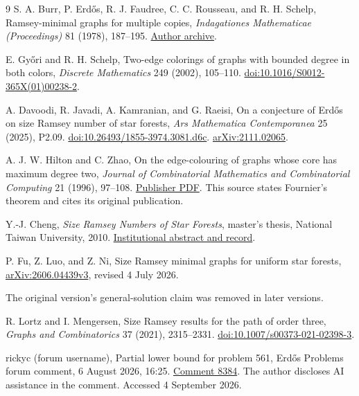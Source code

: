 \documentclass[11pt]{article}
\theoremstyle{remark}\newtheorem{remark}[theorem]{Remark}
\begin{document}
\begin{thebibliography}{9}
S. A. Burr, P. Erd\H{o}s, R. J. Faudree, C. C. Rousseau, and R. H. Schelp,
Ramsey-minimal graphs for multiple copies,
\emph{Indagationes Mathematicae (Proceedings)} 81 (1978), 187--195.
\href{https://users.renyi.hu/~p_erdos/1978-38.pdf}{Author archive}.

E. Gy\H{o}ri and R. H. Schelp,
Two-edge colorings of graphs with bounded degree in both colors,
\emph{Discrete Mathematics} 249 (2002), 105--110.
\href{https://doi.org/10.1016/S0012-365X(01)00238-2}{doi:10.1016/S0012-365X(01)00238-2}.

A. Davoodi, R. Javadi, A. Kamranian, and G. Raeisi,
On a conjecture of Erd\H{o}s on size Ramsey number of star forests,
\emph{Ars Mathematica Contemporanea} 25 (2025), P2.09.
\href{https://doi.org/10.26493/1855-3974.3081.d6c}{doi:10.26493/1855-3974.3081.d6c}.
\href{https://arxiv.org/abs/2111.02065}{arXiv:2111.02065}.

A. J. W. Hilton and C. Zhao,
On the edge-colouring of graphs whose core has maximum degree two,
\emph{Journal of Combinatorial Mathematics and Combinatorial Computing} 21 (1996), 97--108.
\href{https://combinatorialpress.com/article/jcmcc/Volume%20021/vol-21-paper%207.pdf}{Publisher PDF}.
This source states Fournier's theorem and cites its original publication.

Y.-J. Cheng,
\emph{Size Ramsey Numbers of Star Forests},
master's thesis, National Taiwan University, 2010.
\href{https://scholars.lib.ntu.edu.tw/entities/publication/44c55546-025c-43b7-8f29-11a62827cc84}{Institutional abstract and record}.

P. Fu, Z. Luo, and Z. Ni,
Size Ramsey minimal graphs for uniform star forests,
\href{https://arxiv.org/abs/2606.04439v3}{arXiv:2606.04439v3}, revised 4 July 2026.
\par\noindent The original version's general-solution claim was removed in later versions.

R. Lortz and I. Mengersen,
Size Ramsey results for the path of order three,
\emph{Graphs and Combinatorics} 37 (2021), 2315--2331.
\href{https://doi.org/10.1007/s00373-021-02398-3}{doi:10.1007/s00373-021-02398-3}.

rickyc (forum username),
Partial lower bound for problem 561,
Erd\H{o}s Problems forum comment, 6 August 2026, 16:25.
\href{https://www.erdosproblems.com/forum/thread/561\#post-8384}{Comment 8384}.
The author discloses AI assistance in the comment. Accessed 4 September 2026.
\end{thebibliography}
\end{document}
